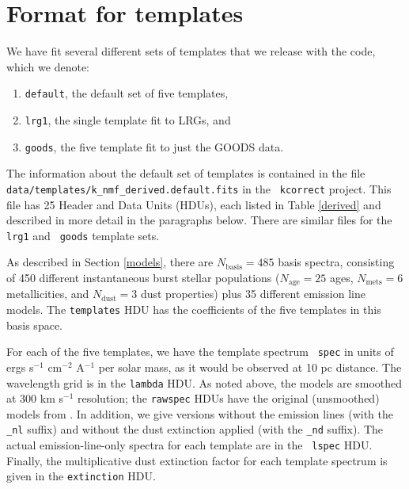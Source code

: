 \documentclass[10pt,preprint]{aastex}
\newcommand{\T}{^{\scriptscriptstyle \top}}
\newcommand{\XXt}{\tilde{X}}
\newcommand{\Xkn}{X_{kn}}
\renewcommand{\AA}{A}
\newcommand{\AAt}{\tilde{A}}
\newcommand{\BB}{B}
\newcommand{\MM}{M}
\newcommand{\MMt}{\tilde{M}}
\newcommand{\Aki}{A_{ki}}
\newcommand{\Bij}{B_{ij}}
\newcommand{\Mjn}{M_{jn}}
\newcommand{\skn}{\sigma_{kn}}
\begin{document}


\section{Format for templates}
\label{format}

We have fit several different sets of templates that we release
with the code, which we denote:
\begin{enumerate}
\item {\tt default}, the default set of five templates, 
\item {\tt lrg1}, the single template fit to LRGs, and 
\item {\tt goods}, the five template fit to just the GOODS data.
\end{enumerate}
The information about the default set of templates is contained in the
file {\tt data/templates/k\_nmf\_derived.default.fits} in the {\tt
kcorrect} project.  This file has 25 Header and Data Units (HDUs),
each listed in Table \ref{derived} and described in more detail in the
paragraphs below.  There are similar files for the {\tt lrg1} and {\tt
goods} template sets.

As described in Section \ref{models}, there are $N_{\mathrm{basis}} =
485$ basis spectra, consisting of 450 different instantaneous burst
stellar populations ($N_{\mathrm{age}} = 25$ ages, $N_{\mathrm{mets}}
= 6$ metallicities, and $N_{\mathrm{dust}}=3$ dust properties) plus 35
different emission line models. The {\tt templates} HDU has the
coefficients of the five templates in this basis space. 

For each of the five templates, we have the template spectrum {\tt
spec} in units of ergs s$^{-1}$ cm$^{-2}$ \AA$^{-1}$ per solar mass,
as it would be observed at 10 pc distance. The wavelength grid is in
the {\tt lambda} HDU. As noted above, the models are smoothed at 300
km s$^{-1}$ resolution; the {\tt rawspec} HDUs have the original
(unsmoothed) models from \citet{bruzual03a}. In addition, we give
versions without the emission lines (with the {\tt \_nl} suffix) and
without the dust extinction applied (with the {\tt \_nd} suffix). The
actual emission-line-only spectra for each template are in the {\tt
lspec} HDU. Finally, the multiplicative dust extinction factor for
each template spectrum is given in the {\tt extinction} HDU.
\end{document}
